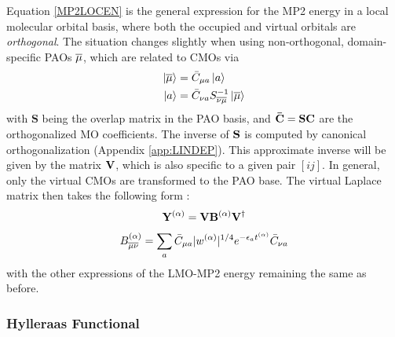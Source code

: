 \noindent Equation \ref{MP2LOCEN} is the general expression for the MP2 energy in a local molecular orbital basis, where both the occupied and virtual orbitals are \emph{orthogonal}. The situation changes slightly when using non-orthogonal, domain-specific PAOs $\overline{\mu}$, which are related to CMOs via
\begin{align}
\ket{\overline{\mu}} &= \bar{C}_{\mu a} \ket{a} \\
\ket{a} &= \bar{C}_{\nu a} S_{\overline{\nu}\overline{\mu}}^{-1} \ket{\overline{\mu}} 
\end{align}
\noindent with $\mathbf{S}$ being the overlap matrix in the PAO basis, and $\mathbf{\bar{C}} = \mathbf{SC}$ are the orthogonalized MO coefficients. The inverse of $\mathbf{S}$ is computed by canonical orthogonalization (Appendix \ref{app:LINDEP}). This approximate inverse will be given by the matrix $\mathbf{V}$, which is also specific to a given pair $[ij]$. In general, only the virtual CMOs are transformed to the PAO base. The virtual Laplace matrix then takes the following form \cite{Kat2008}:
\begin{equation}
\mathbf{Y}^{(\alpha)} = \mathbf{V} \mathbf{B}^{(\alpha)} \mathbf{V} ^{\dagger} 
\end{equation}
\begin{equation}
B_{\overline{\mu}\overline{\nu}}^{(\alpha)} = \sum_a \bar{C}_{\mu a} |w^{(\alpha)}|^{1/4} e^{-\epsilon_a t^{(\alpha)}} \bar{C}_{\nu a}
\end{equation}
\noindent with the other expressions of the LMO-MP2 energy remaining the same as before.


\subsubsection{Hylleraas Functional}

